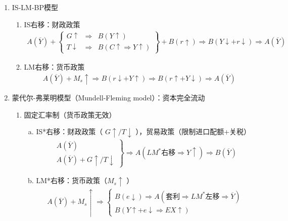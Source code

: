 \documentclass[12pt]{book}
\begin{document}
\begin{enumerate}[1.]
    \item IS-LM-BP模型
    \begin{enumerate}[(1)]
        \item IS右移：财政政策
        \begin{gather*}
            A(\overline{Y})+ \left\{\begin{matrix} G\uparrow&\Rightarrow& B(Y\uparrow)\\ 
            T\downarrow &\Rightarrow&  B(C\uparrow\Rightarrow Y\uparrow) \end{matrix}\right\}  +B(r\uparrow) \Rightarrow B(Y\downarrow+r\downarrow) \Rightarrow A(\overline{Y}) 
        \end{gather*}
        \item  LM右移：货币政策
        \begin{gather*}
            A(\overline{Y})+M_{s}\uparrow\Rightarrow B(r\downarrow+Y\uparrow)\Rightarrow B(r\uparrow+Y\downarrow)\Rightarrow A(\overline{Y}) 
        \end{gather*}
    \end{enumerate}
    \item 蒙代尔-弗莱明模型（Mundell-Fleming model）：资本完全流动
    \begin{enumerate}[(1)]
        \item 固定汇率制（货币政策无效）
        \begin{enumerate}[a.]
            \item IS*右移：财政政策（ $G↑/T↓$ ），贸易政策（限制进口配额+关税）
            \begin{gather*}
                \left.\begin{matrix} A(\overline{Y})\\ A(\overline{Y})+G\uparrow/T\downarrow \end{matrix}\right\} \Rightarrow A(LM^*右移\Rightarrow Y\uparrow)\Rightarrow B(\overline{Y}) 
            \end{gather*}
            \item LM*右移：货币政策（$ M_s\uparrow$ ）
            \begin{gather*}
                A(\overline{Y})+M_s \uparrow \Rightarrow \left\{\begin{matrix} B(e↓)\Rightarrow A(套利\Rightarrow LM^*左移\Rightarrow \overline{Y})\\ B(Y↑+e↓\Rightarrow EX↑) \end{matrix}\right.
            \end{gather*}

\end{enumerate}
\end{enumerate}
\end{enumerate}
\end{document}
